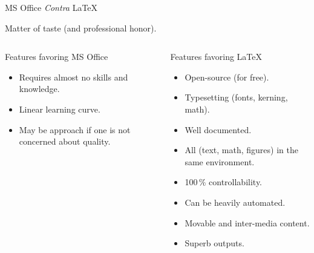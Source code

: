 \documentclass[xcolor=dvipsnames, aspectratio=169, handout, intlimits]{beamer}
\begin{document}
\begin{frame}{MS Office \textit{Contra} \LaTeX}

\vspace{-0.5cm}
Matter of taste (and professional honor).

\begin{columns}[t]
\begin{column}{0.475\textwidth}
	\begin{block}{Features favoring MS Office}
		\begin{itemize}
			\item Requires almost no skills and knowledge.
			\item Linear learning curve.
			\item May be  approach if one is not concerned about quality.
		\end{itemize}
	\end{block}
\end{column}
\begin{column}{0.475\textwidth}
	\begin{block}{Features favoring \LaTeX}
		\begin{itemize}
			\item Open-source (for free).
			\item Typesetting (fonts, kerning, math).
			\item Well documented.
			\item All (text, math, figures) in the same environment.
			\item 100\,\% controllability.
			\item Can be heavily automated.
			\item Movable and inter-media content.
			\item Superb outputs.
		\end{itemize}
	\end{block}
\end{column}
\end{columns}

\end{frame}
\end{document}
